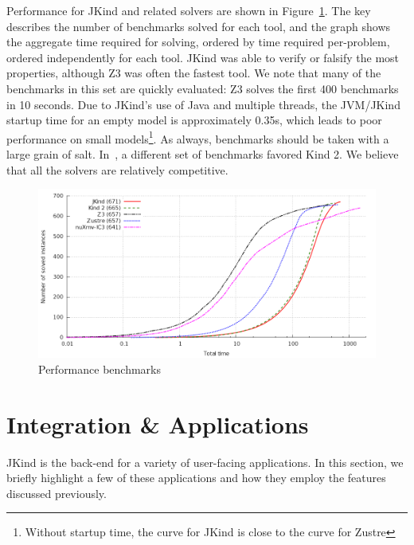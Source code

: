 \documentclass{llncs}
\newcommand{\jkind}{{\sc JKind}\xspace}
\newcommand{\kind}{{\sc Kind}\xspace}
\newcommand{\jkindapi}{{\sc JKindApi}\xspace}
\newcommand{\lustre}{{\sc Lustre}\xspace}
\newcommand{\zustre}{{\sc Zustre}\xspace}
\newcommand{\zthree}{{\sc Z3}\xspace}
\newcommand{\mike}[1]{\textcolor{red}{#1}}
\begin{document}
Performance for \jkind and related solvers are shown in
Figure~\ref{fig:benchmark}. The key describes the number of benchmarks
solved for each tool, and the graph shows the aggregate time required
for solving, ordered by time required per-problem, ordered
independently for each tool. \jkind was able to verify or falsify the
most properties, although \zthree was often the fastest tool.  We note
that many of the benchmarks in this set are quickly evaluated: \zthree
solves the first 400 benchmarks in 10 seconds.  Due to \jkind's use of
Java and multiple threads, the JVM/\jkind startup time for an empty
model is approximately 0.35s, which leads to poor performance on small
models\footnote{Without startup time, the curve for \jkind is close to
  the curve for \zustre}.  As always, benchmarks should be taken with
a large grain of salt.  In~\cite{champion2016cav}, a different set of
benchmarks favored \kind2.  We believe that all the solvers are
relatively competitive.


\begin{figure}
  \begin{center}
    \includegraphics[width=\textwidth]{graph.png}
  \end{center}
  \vspace{-2em}
  \caption{Performance benchmarks}
  \vspace{-1em}
  \label{fig:benchmark}
\end{figure}


\section{Integration \& Applications}


\jkind is the back-end for a variety of user-facing applications. In this section, we briefly highlight a few of these applications and how they employ the features discussed previously.
%
%
\end{document}
